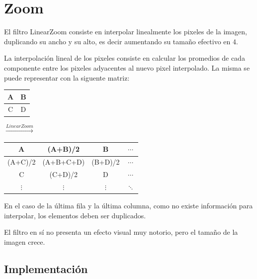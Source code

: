 

\section{Zoom}

El filtro LinearZoom consiste en interpolar linealmente los pixeles de la imagen, duplicando su ancho y su alto, es decir aumentando su tamaño efectivo en 4.

La interpolación lineal de los pixeles consiste en calcular los promedios de cada componente entre los pixeles adyacentes al nuevo pixel interpolado. La misma se puede representar con la siguente matriz:

\begin{table}[H]
  \centering
  \begin{tabular}{ | c | c | }
    \hline
    A & B \\ \hline
    C & D \\
    \hline
  \end{tabular}
  {\LARGE$\xrightarrow{LinearZoom}$}
  \begin{tabular}{ | c | c | c | c |}
    \hline
    A & (A+B)/2 & B & $\cdots$ \\ \hline
    (A+C)/2 & (A+B+C+D) & (B+D)/2 & $\cdots$ \\ \hline
    C & (C+D)/2 & D & $\cdots$ \\ \hline
    $\vdots$ & $\vdots$ & $\vdots$ & $\ddots$ \\
    \hline
  \end{tabular}
\end{table}

En el caso de la última fila y la última columna, como no existe información para interpolar, los elementos deben ser duplicados.

El filtro en sí no presenta un efecto visual muy notorio, pero el tamaño de la imagen crece.

\subsection{Implementación}

